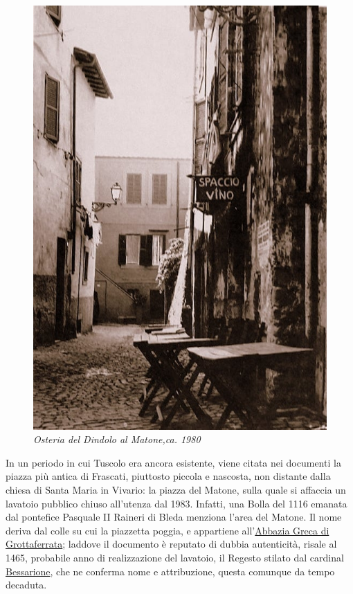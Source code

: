 \documentclass[
  letterpaper,
  DIV=11,
  numbers=noendperiod]{scrartcl}
\begin{document}
\begin{figure}[H]

{\centering \includegraphics{../../images/2024/san_rocco/2matone.jpg}

}

\caption{\emph{Osteria del Dindolo al Matone,ca. 1980}}

\end{figure}%

In un periodo in cui Tuscolo era ancora esistente, viene citata nei
documenti la piazza più antica di Frascati, piuttosto piccola e
nascosta, non distante dalla chiesa di Santa Maria in Vivario: la piazza
del Matone, sulla quale si affaccia un lavatoio pubblico chiuso
all'utenza dal 1983. Infatti, una Bolla del 1116 emanata dal pontefice
Pasquale II Raineri di Bleda menziona l'area del Matone. Il nome deriva
dal colle su cui la piazzetta poggia, e appartiene
all'\href{2016-12-31-momenti-fine-comandini.html\#parus\%C3\%ACa-unica-via}{Abbazia
Greca di Grottaferrata}; laddove il documento è reputato di dubbia
autenticità, risale al 1465, probabile anno di realizzazione del
lavatoio, il Regesto stilato dal cardinal
\href{2014-04-29-strade-fener-comandini.html\#partire}{Bessarione}, che
ne conferma nome e attribuzione, questa comunque da tempo decaduta.
\end{document}
